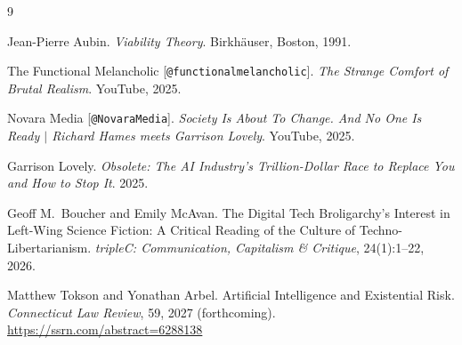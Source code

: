 \documentclass[12pt, a4paper]{article}
\theoremstyle{plain}
\theoremstyle{definition}
\theoremstyle{remark}
\begin{document}
\bigskip
\begin{thebibliography}{9}

Jean-Pierre Aubin.
\textit{Viability Theory}.
Birkhäuser, Boston, 1991.

The Functional Melancholic [\texttt{@functionalmelancholic}].
\textit{The Strange Comfort of Brutal Realism}.
YouTube, 2025.

Novara Media [\texttt{@NovaraMedia}].
\textit{Society Is About To Change. And No One Is Ready
  $\vert$ Richard Hames meets Garrison Lovely}.
YouTube, 2025.

Garrison Lovely.
\textit{Obsolete: The AI Industry's Trillion-Dollar Race to Replace You
  and How to Stop It}.
2025.

Geoff M.\ Boucher and Emily McAvan.
The Digital Tech Broligarchy's Interest in Left-Wing Science Fiction:
  A Critical Reading of the Culture of Techno-Libertarianism.
\textit{tripleC: Communication, Capitalism \& Critique},
  24(1):1--22, 2026.

Matthew Tokson and Yonathan Arbel.
Artificial Intelligence and Existential Risk.
\textit{Connecticut Law Review}, 59, 2027 (forthcoming).
\url{https://ssrn.com/abstract=6288138}

\end{thebibliography}
\end{document}
